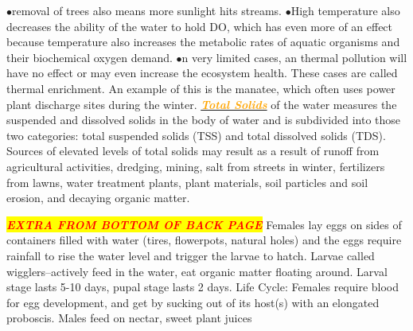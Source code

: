 \documentclass{article}
\newcommand{\ddd}{$\bullet$}
\newcommand{\red}[1]{\textcolor{red}{#1}}
\newcommand{\orange}[1]{\textcolor{orange}{#1}}
\newcommand{\mysection}[1]{\colorbox{yellow}{\textbf{\textit{\red{#1}}}}}
\newcommand{\mysubsection}[1]{\underline{\textbf{{\textit{\orange{#1}}}}}}
\begin{document}
\begin{multicols*}{4}
            \ddd removal of trees also means more sunlight hits streams. 
            \ddd  High temperature also decreases the ability of the water to hold DO, which has even more of an effect because temperature also increases the metabolic rates of aquatic organisms and their biochemical oxygen demand. 
            \ddd n very limited cases, an thermal pollution will have no effect or may even increase the ecosystem health. These cases are called thermal enrichment. An example of this is the manatee, which often uses power plant discharge sites during the winter.
        \mysubsection{Total Solids} of the water measures the suspended and dissolved solids in the body of water and is subdivided into those two categories: total suspended solids (TSS) and total dissolved solids (TDS). Sources of elevated levels of total solids may result as a result of runoff from agricultural activities, dredging, mining, salt from streets in winter, fertilizers from lawns, water treatment plants, plant materials, soil particles and soil erosion, and decaying organic matter.
        
        \mysection{EXTRA FROM BOTTOM OF BACK PAGE}
        Females lay eggs on sides of containers filled with water (tires, flowerpots, natural holes) and the eggs require rainfall to rise the water level and trigger the larvae to hatch. Larvae called wigglers--actively feed in the water, eat organic matter floating around. Larval stage lasts 5-10 days, pupal stage lasts 2 days. Life Cycle: Females require blood for egg development, and get by sucking out of its host(s) with an elongated proboscis. Males feed on nectar, sweet plant juices
\end{multicols*}
\end{document}
